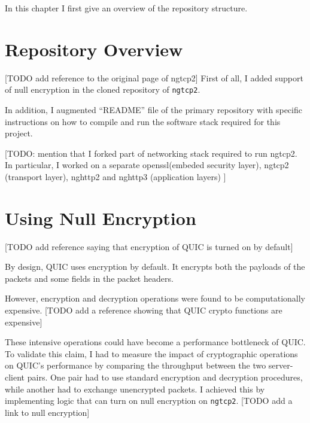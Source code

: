 \documentclass[12pt,a4paper,twoside,openright]{report}
\begin{document}




In this chapter I first give an overview of the repository structure.


\section{Repository Overview} 
[TODO add reference to the original page of ngtcp2]
First of all, I added support of null encryption in the cloned repository of \texttt{ngtcp2}.

In addition, I augmented \enquote{README} file of the primary repository with specific instructions on how to compile and run the software stack required for this project.

[TODO: mention that I forked part of networking stack required to run ngtcp2. In particular, I worked on a separate openssl(embeded security layer), ngtcp2 (transport layer), nghttp2 and nghttp3 (application layers) ]

\section{Using Null Encryption}
[TODO add reference saying that encryption of QUIC is turned on by default]

By design, QUIC uses encryption by default.
It encrypts both the payloads of the packets and some fields in the packet headers.


However, encryption and decryption operations were found to be computationally expensive.
[TODO add a reference showing that QUIC crypto functions are expensive]

These intensive operations could have become a performance bottleneck of QUIC.
To validate this claim, I had to measure the impact of cryptographic operations on QUIC's performance by comparing the throughput between the two server-client pairs.
One pair had to use standard encryption and decryption procedures, while another had to exchange unencrypted packets.
I achieved this by implementing logic that can turn on null encryption on \texttt{ngtcp2}.
[TODO add a link to null encryption]
\end{document}
